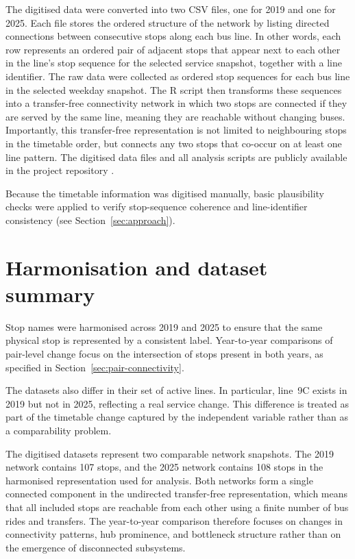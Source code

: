 \documentclass[12pt,a4paper,oneside]{report}
\begin{document}
The digitised data were converted into two CSV files, one for 2019 and one for 2025.
Each file stores the ordered structure of the network by listing directed connections between consecutive stops along each bus line.
In other words, each row represents an ordered pair of adjacent stops that appear next to each other in the line's stop sequence for the selected service snapshot, together with a line identifier.
The raw data were collected as ordered stop sequences for each bus line in the selected weekday snapshot.
The R script then transforms these sequences into a transfer-free connectivity network in which two stops are connected if they are served by the same line, meaning they are reachable without changing buses.
Importantly, this transfer-free representation is not limited to neighbouring stops in the timetable order, but connects any two stops that co-occur on at least one line pattern.
The digitised data files and all analysis scripts are publicly available in the project repository \citep{bachinger2026}.

Because the timetable information was digitised manually, basic plausibility checks were applied to verify stop-sequence coherence and line-identifier consistency (see Section~\ref{sec:approach}).

\section{Harmonisation and dataset summary}\label{sec:harmonising}

Stop names were harmonised across 2019 and 2025 to ensure that the same physical stop is represented by a consistent label.
Year-to-year comparisons of pair-level change focus on the intersection of stops present in both years, as specified in Section~\ref{sec:pair-connectivity}.

The datasets also differ in their set of active lines.
In particular, line~9C exists in 2019 but not in 2025, reflecting a real service change.
This difference is treated as part of the timetable change captured by the independent variable rather than as a comparability problem.

The digitised datasets represent two comparable network snapshots.
The 2019 network contains 107 stops, and the 2025 network contains 108 stops in the harmonised representation used for analysis.
Both networks form a single connected component in the undirected transfer-free representation, which means that all included stops are reachable from each other using a finite number of bus rides and transfers.
The year-to-year comparison therefore focuses on changes in connectivity patterns, hub prominence, and bottleneck structure rather than on the emergence of disconnected subsystems.
\end{document}
